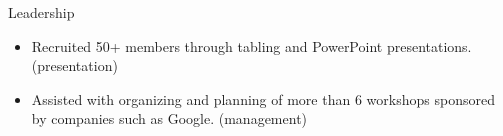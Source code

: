 \documentclass{resume} %
\begin{document}
\begin{workSection}{Leadership}
    \customItem[
        title=Association for Computing Machinery,
        keyHighlight=Multiple leadership roles{,} including publicity offier \& treasurer),
        duration=Fall 2022 - Present
    ]
    \begin{itemize}
        \vspace{-0.5em}
        \itemsep -6pt {}
        \item Recruited 50+ members through tabling and PowerPoint presentations. (presentation)
        \item Assisted with organizing and planning of more than 6 workshops sponsored by companies such as Google. (management)
    \end{itemize}
\end{workSection}
\end{document}
